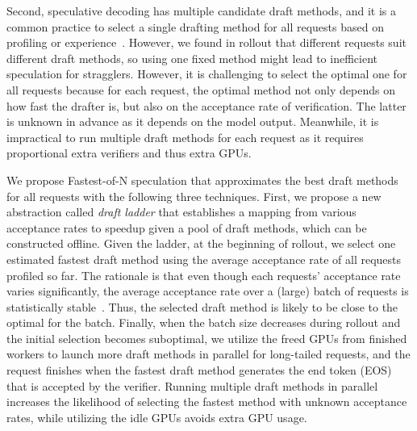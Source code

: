 Second, speculative decoding has multiple candidate draft methods,
and it is a common practice to select 
a single drafting method for all requests based on profiling or experience~\cite{spd,specinfer}.
However, we found in rollout that different requests suit different draft methods, 
so using one fixed method might lead to inefficient speculation 
for stragglers. 
However,
it is challenging to select the optimal one for all requests because
for each request, the optimal method not only depends on how fast the drafter is,
but also on the acceptance rate of verification.
The latter is unknown in advance as it depends on the model output. 
Meanwhile, it is impractical to run multiple draft methods for each request
as it requires proportional extra verifiers and thus extra GPUs.

We propose Fastest-of-N speculation that approximates the 
best draft methods for all requests with the following three techniques. 
First, we propose a new abstraction called \emph{draft ladder} that 
establishes a mapping from various acceptance rates to speedup given a pool of draft methods,
which can be constructed offline. 
Given the ladder, at the beginning of rollout,
we select one estimated fastest {draft method}
using the average acceptance rate of all requests profiled so far.
The rationale is that even though each requests' acceptance rate varies significantly,
the average acceptance rate over a (large) batch of requests is statistically stable~\cite{hoeffding1963probability}.
Thus, the selected draft method is likely to be close to the optimal for the batch. 
Finally, when the batch size decreases during rollout and
the initial selection becomes suboptimal,
we utilize the freed GPUs from finished workers to launch more draft methods in parallel for long-tailed requests,
and the request finishes when the fastest draft method 
generates the end token (EOS) that is accepted by the verifier.
Running multiple draft methods in parallel increases
the likelihood of selecting the fastest method
with unknown acceptance rates, while utilizing the idle GPUs
avoids extra GPU usage.


